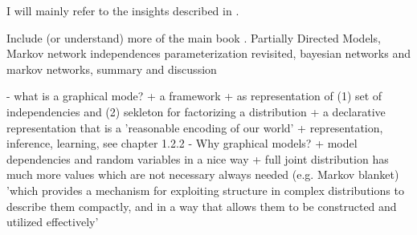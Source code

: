 I will mainly refer to the insights described in \cite{koller2009probabilistic}.

Include (or understand) more of the main book \cite{koller2009probabilistic}. Partially Directed Models, Markov network independences parameterization revisited, bayesian networks and markov networks, summary and discussion

- what is a graphical mode?
 + a framework
 + as representation of (1) set of independencies and (2) sekleton for factorizing a distribution
 + a declarative representation that is a 'reasonable encoding of our world'
 + representation, inference, learning, see chapter 1.2.2
- Why graphical models?
 + model dependencies and random variables in a nice way
 + full joint distribution has much more values which are not necessary always needed (e.g. Markov blanket) 'which provides a mechanism for
exploiting structure in complex distributions to describe them compactly, and in a way that
allows them to be constructed and utilized effectively' \cite{koller2009probabilistic}